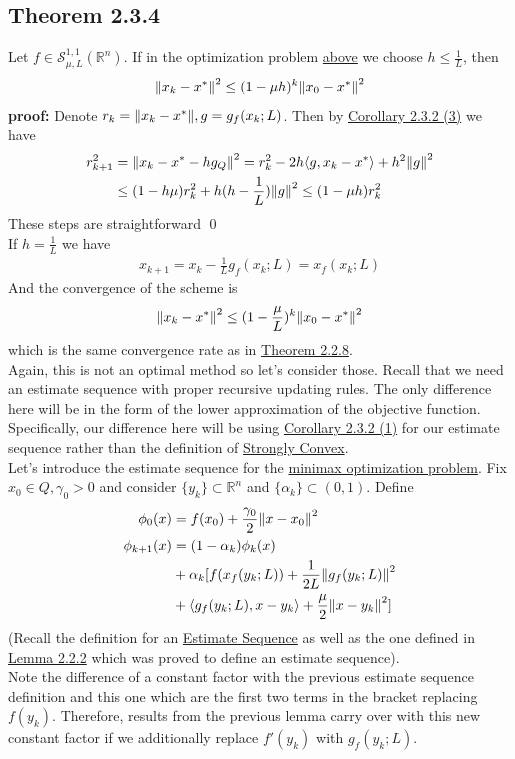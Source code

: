 \documentclass[12pt,a4paper]{article}
\begin{document}
	 \subsection*{Theorem 2.3.4}\label{thm234}
	 Let $f \in \mathcal{S}_{\mu,L}^{1,1}(\mathbb{R}^n)$. If in the optimization problem \hyperref[gradoptminimax]{above} we choose $h \leq \frac{1}{L}$, then
	 \begin{align*}
	 	\norm{x_k - x^*}^2 \leq (1 - \mu h)^k\norm{x_0 - x^*}^2
	 \end{align*}
	 \textbf{proof:} Denote $r_k = \norm{x_k - x^*}, g = g_f(x_k;L)$. Then by \hyperref[cor232_3]{Corollary 2.3.2 (3)} we have
	 \begin{align*}
	 	r_{k+1}^2 &= \norm{x_k - x^* - hg_Q}^2 = r_k^2 - 2h \langle g,x_k - x^* \rangle + h^2\norm{g}^2 \\
	 	&\leq (1 - h \mu)r_k^2 + h(h - \frac{1}{L})\norm{g}^2 \leq (1 - \mu h)r_k^2
	 \end{align*}
	These steps are straightforward \qed \\
	If $h = \frac{1}{L}$ we have
	\begin{align*}
		x_{k+1} = x_k - \frac{1}{L}g_f(x_k;L) = x_f(x_k;L)
	\end{align*}
	And the convergence of the scheme is
	\begin{align*}
		\norm{x_k - x^*}^2 \leq (1 - \frac{\mu}{L})^k\norm{x_0 - x^*}^2
	\end{align*}
	which is the same convergence rate as in \hyperref[thm228]{Theorem 2.2.8}. \\
	Again, this is not an optimal method so let's consider those. Recall that we need an estimate sequence with proper recursive updating rules. The only difference here will be in the form of the lower approximation of the objective function. Specifically, our difference here will be using \hyperref[cor232_1]{Corollary 2.3.2 (1)} for our estimate sequence rather than the definition of \hyperref[sec:Def]{Strongly Convex}. \\
	Let's introduce the estimate sequence for the \hyperref[minimax23]{minimax optimization problem}. Fix $x_0 \in Q, \gamma_0 > 0$ and consider $\{y_k\} \subset \mathbb{R}^n$ and $\{\alpha_k\}\subset (0,1)$. Define
	\begin{align*}
		\phi_0(x) &= f(x_0) + \frac{\gamma_0}{2}\norm{x - x_0}^2 \\
		\phi_{k+1}(x) &= (1 - \alpha_k)\phi_k(x) \\
		&+ \alpha_k[f(x_f(y_k;L)) + \frac{1}{2L}\norm{g_f(y_k;L)}^2 \\
		&+ \langle g_f(y_k;L), x - y_k \rangle + \frac{\mu}{2}\norm{x - y_k}^2]
	\end{align*}
	(Recall the definition for an \hyperref[sec:Def]{Estimate Sequence} as well as the one defined in \hyperref[lem222]{Lemma 2.2.2} which was proved to define an estimate sequence). \\
	Note the difference of a constant factor with the previous estimate sequence definition and this one which are the first two terms in the bracket replacing $f(y_k)$. Therefore, results from the previous lemma carry over with this new constant factor if we additionally replace $f'(y_k)$ with $g_f(y_k;L)$.
\end{document}

